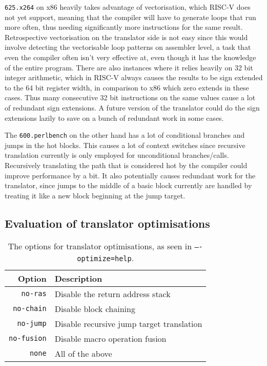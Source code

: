 \texttt{625.x264} on x86 heavily takes advantage of vectorisation, which RISC-V does not yet support, meaning that the compiler will have to generate loops that run more often, thus needing significantly more instructions for the same result.
Retrospective vectorisation on the translator side is not easy since this would involve detecting the vectorisable loop patterns on assembler level, a task that even the compiler often isn't very effective at, even though it has the knowledge of the entire program.
There are also instances where it relies heavily on 32 bit integer arithmetic, which in RISC-V always causes the results to be sign extended to the 64 bit register width, in comparison to x86 which zero extends in these cases.
Thus many consecutive 32 bit instructions on the same values cause a lot of redundant sign extensions.
A future version of the translator could do the sign extensions lazily to save on a bunch of redundant work in some cases.

The \texttt{600.perlbench} on the other hand has a lot of conditional branches and jumps in the hot blocks.
This causes a lot of context switches since recursive translation currently is only employed for unconditional branches/calls.
Recursively translating the path that is considered hot by the compiler could improve performance by a bit.
It also potentially causes redundant work for the translator, since jumps to the middle of a basic block currently are handled by treating it like a new block beginning at the jump target.



\subsection{Evaluation of translator optimisations}
\begin{table}
	\centering
	\begin{tabular}{rl}
		\toprule
		\textbf{Option} & \textbf{Description}\\
		\midrule
		\texttt{no-ras} & Disable the return address stack\\
		\texttt{no-chain} & Disable block chaining\\
		\texttt{no-jump} & Disable recursive jump target translation\\
		\texttt{no-fusion} & Disable macro operation fusion\\
		\texttt{none} & All of the above\\
		\bottomrule
	\end{tabular}
	\caption[Translator optimisation options]%
	{The options for translator optimisations, as seen in \texttt{----optimize=help}.}
	\label{tab:opt-options}
\end{table}

